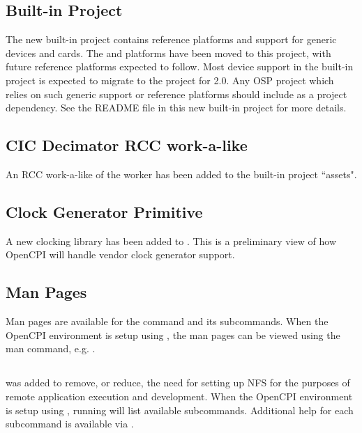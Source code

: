 \subsection{Built-in  Project}
\label{sec:17_platform_project}
The new built-in  project contains reference platforms and support for generic devices and cards. The  and  platforms have been moved to this project, with future reference platforms expected to follow. Most device support in the built-in  project is expected to migrate to the  project for 2.0. Any OSP project which relies on such generic support or reference platforms should include  as a project dependency. See the README file in this new built-in project for more details.

\subsection{CIC Decimator RCC work-a-like}
\label{sec17_cic_dec}
An RCC work-a-like of the  worker has been added to the built-in project ``assets".

\subsection{Clock Generator Primitive}
\label{sec:17_clocking}
A new clocking library has been added to . This is a preliminary view of how OpenCPI will handle vendor clock generator support.

\subsection{Man Pages}
\label{sec:17_man_pages}
Man pages are available for the  command and its subcommands. When the OpenCPI environment is setup using , the man pages can be viewed using the man command, e.g. .

\subsection{}
\label{sec:17_ocpiremote}
 was added to remove, or reduce, the need for setting up NFS for the purposes of remote application execution and development. When the OpenCPI environment is setup using , running  will list available subcommands. Additional help for each subcommand is available via .

